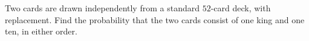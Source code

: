 Two cards are drawn independently from a standard $52$-card deck, with replacement. Find the probability that the two cards consist of one king and one ten, in either order.
